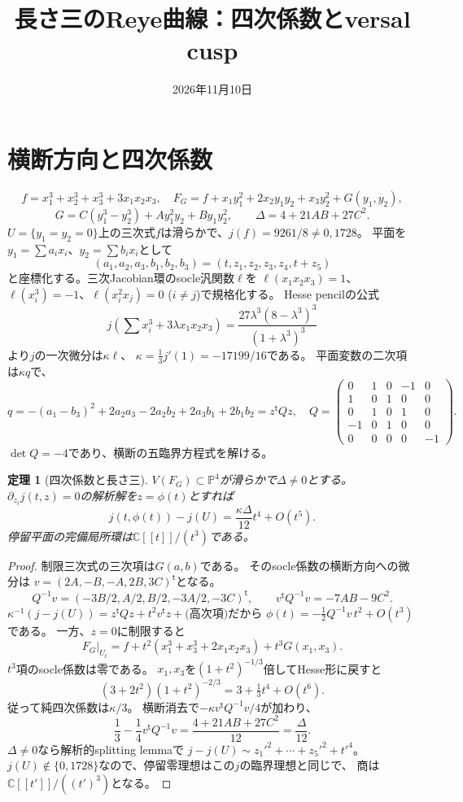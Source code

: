 \documentclass[11pt,a4paper]{ltjsarticle}
\title{長さ三のReye曲線：四次係数とversal cusp}
\author{}
\date{2026年11月10日}
\newtheorem{theorem}{定理}[section]
\newcommand{\CC}{\mathbb C}
\newcommand{\PP}{\mathbb P}
\begin{document}
\maketitle
\section{横断方向と四次係数}
\[
f=x_1^3+x_2^3+x_3^3+3x_1x_2x_3,\quad
F_G=f+x_1y_1^2+2x_2y_1y_2+x_3y_2^2+G(y_1,y_2),
\]
\[
G=C(y_1^3-y_2^3)+Ay_1^2y_2+By_1y_2^2,\qquad
\Delta=4+21AB+27C^2.
\]
$U=\{y_1=y_2=0\}$上の三次式$f$は滑らかで、$j(f)=9261/8\ne0,1728$。
平面を$y_1=\sum a_ix_i$、$y_2=\sum b_ix_i$として
\[
(a_1,a_2,a_3,b_1,b_2,b_3)=(t,z_1,z_2,z_3,z_4,t+z_5)
\]
と座標化する。三次Jacobian環のsocle汎関数$\ell$を
$\ell(x_1x_2x_3)=1$、
$\ell(x_i^3)=-1$、$\ell(x_i^2x_j)=0$ ($i\ne j$)で規格化する。
Hesse pencilの公式
\[
j\left(\sum x_i^3+3\lambda x_1x_2x_3\right)
=\frac{27\lambda^3(8-\lambda^3)^3}{(1+\lambda^3)^3}
\]
より$j$の一次微分は$\kappa\ell$、
$\kappa=\tfrac13j'(1)=-17199/16$である。
平面変数の二次項は$\kappa q$で、
\[
q=-(a_1-b_3)^2+2a_2a_3-2a_2b_2+2a_3b_1+2b_1b_2=z^{\mathsf t}Qz,
\quad
Q=\begin{pmatrix}
0&1&0&-1&0\\
1&0&1&0&0\\
0&1&0&1&0\\
-1&0&1&0&0\\
0&0&0&0&-1
\end{pmatrix}.
\]
$\det Q=-4$であり、横断の五臨界方程式を解ける。

\begin{theorem}[四次係数と長さ三]\label{thm:quartic}
$V(F_G)\subset\PP^4$が滑らかで$\Delta\ne0$とする。
$\partial_{z_i}j(t,z)=0$の解析解を$z=\phi(t)$とすれば
\[
j(t,\phi(t))-j(U)
=\frac{\kappa\Delta}{12}t^4+O(t^5).
\]
停留平面の完備局所環は$\CC[[t]]/(t^3)$である。
\end{theorem}
\begin{proof}
制限三次式の三次項は$G(a,b)$である。
そのsocle係数の横断方向への微分は
$v=(2A,-B,-A,2B,3C)^{\mathsf t}$となる。
\[
Q^{-1}v=(-3B/2,A/2,B/2,-3A/2,-3C)^{\mathsf t},\qquad
v^{\mathsf t}Q^{-1}v=-7AB-9C^2.
\]
$\kappa^{-1}(j-j(U))=z^{\mathsf t}Qz+t^2v^{\mathsf t}z+
\text{(高次項)}$だから
$\phi(t)=-\frac12Q^{-1}v\,t^2+O(t^3)$である。
一方、$z=0$に制限すると
\[
F_G|_{U_t}=f+t^2(x_1^3+x_3^3+2x_1x_2x_3)+t^3G(x_1,x_3).
\]
$t^3$項のsocle係数は零である。
$x_1,x_3$を$(1+t^2)^{-1/3}$倍してHesse形に戻すと
\[
(3+2t^2)(1+t^2)^{-2/3}=3+\tfrac13t^4+O(t^6).
\]
従って純四次係数は$\kappa/3$。
横断消去で$-\kappa v^{\mathsf t}Q^{-1}v/4$が加わり、
\[
\frac13-\frac14v^{\mathsf t}Q^{-1}v
=\frac{4+21AB+27C^2}{12}=\frac{\Delta}{12}.
\]
$\Delta\ne0$なら解析的splitting lemmaで
$j-j(U)\sim z_1'^2+\cdots+z_5'^2+t'^4$。
$j(U)\notin\{0,1728\}$なので、停留零理想はこの$j$の臨界理想と同じで、
商は$\CC[[t']]/((t')^3)$となる。
\end{proof}
\end{document}
